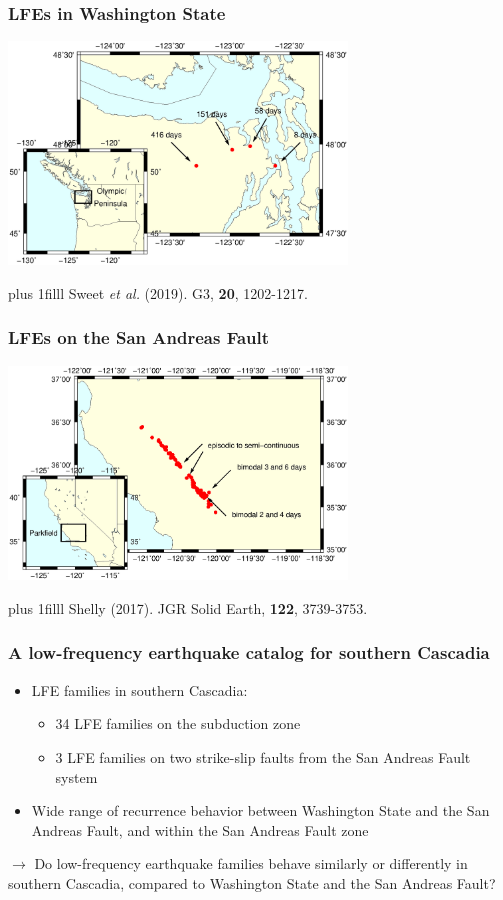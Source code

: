 \documentclass{beamer}
\newcommand{\btVFill}{\vskip0pt plus 1filll}
\begin{document}
	\begin{frame}
		\frametitle{LFEs in Washington State}
		\begin{center}
			\includegraphics[trim={1cm 3cm 1cm 14cm}, clip, width=9cm]{LFE_catalogs/cascadia.eps}
		\end{center}
		\btVFill
		\tiny{Sweet \textit{et al.} (2019). G3, \textbf{20}, 1202-1217.}
	\end{frame}

	\begin{frame}
		\frametitle{LFEs on the San Andreas Fault}
		\begin{center}
			\includegraphics[trim={1cm 3cm 1cm 14cm}, clip, width=9cm]{LFE_catalogs/sanandreas.eps}
		\end{center}
		\btVFill
		\tiny{Shelly (2017). JGR Solid Earth, \textbf{122}, 3739-3753.}
	\end{frame}

	\begin{frame}
		\frametitle{A low-frequency earthquake catalog for southern Cascadia}
		\begin{itemize}
			\item LFE families in southern Cascadia:
			\begin{itemize}
				\item 34 LFE families on the subduction zone
				\item 3 LFE families on two strike-slip faults from the San Andreas Fault system
			\end{itemize}
			\item Wide range of recurrence behavior between Washington State and the San Andreas Fault, and within the San Andreas Fault zone
		\end{itemize}
		
		\begin{block}{}
			$\rightarrow$ Do low-frequency earthquake families behave similarly or differently in southern Cascadia, compared to Washington State and the San Andreas Fault?
		\end{block}
	\end{frame}
\end{document}
